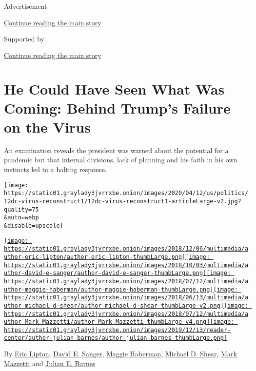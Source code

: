 Advertisement

\protect\hyperlink{after-top}{Continue reading the main story}

Supported by

\protect\hyperlink{after-sponsor}{Continue reading the main story}

\hypertarget{he-could-have-seen-what-was-coming-behind-trumps-failure-on-the-virus}{%
\section{He Could Have Seen What Was Coming: Behind Trump's Failure on
the
Virus}\label{he-could-have-seen-what-was-coming-behind-trumps-failure-on-the-virus}}

An examination reveals the president was warned about the potential for
a pandemic but that internal divisions, lack of planning and his faith
in his own instincts led to a halting response.

\texttt{[image: https://static01.graylady3jvrrxbe.onion/images/2020/04/12/us/politics/12dc-virus-reconstruct1/12dc-virus-reconstruct1-articleLarge-v2.jpg?quality=75\\\&auto=webp\\\&disable=upscale]}

\href{https://www.nytimes3xbfgragh.onion/by/eric-lipton}{\texttt{[image: https://static01.graylady3jvrrxbe.onion/images/2018/12/06/multimedia/author-eric-lipton/author-eric-lipton-thumbLarge.png]}}\href{https://www.nytimes3xbfgragh.onion/by/david-e-sanger}{\texttt{[image: https://static01.graylady3jvrrxbe.onion/images/2018/10/03/multimedia/author-david-e-sanger/author-david-e-sanger-thumbLarge.png]}}\href{https://www.nytimes3xbfgragh.onion/by/maggie-haberman}{\texttt{[image: https://static01.graylady3jvrrxbe.onion/images/2018/07/12/multimedia/author-maggie-haberman/author-maggie-haberman-thumbLarge.png]}}\href{https://www.nytimes3xbfgragh.onion/by/michael-d-shear}{\texttt{[image: https://static01.graylady3jvrrxbe.onion/images/2018/06/13/multimedia/author-michael-d-shear/author-michael-d-shear-thumbLarge-v2.png]}}\href{https://www.nytimes3xbfgragh.onion/by/mark-mazzetti}{\texttt{[image: https://static01.graylady3jvrrxbe.onion/images/2018/07/12/multimedia/author-Mark-Mazzetti/author-Mark-Mazzetti-thumbLarge-v4.png]}}\href{https://www.nytimes3xbfgragh.onion/by/julian-e-barnes}{\texttt{[image: https://static01.graylady3jvrrxbe.onion/images/2019/12/13/reader-center/author-julian-barnes/author-julian-barnes-thumbLarge.png]}}

By \href{https://www.nytimes3xbfgragh.onion/by/eric-lipton}{Eric
Lipton},
\href{https://www.nytimes3xbfgragh.onion/by/david-e-sanger}{David E.
Sanger},
\href{https://www.nytimes3xbfgragh.onion/by/maggie-haberman}{Maggie
Haberman},
\href{https://www.nytimes3xbfgragh.onion/by/michael-d-shear}{Michael D.
Shear}, \href{https://www.nytimes3xbfgragh.onion/by/mark-mazzetti}{Mark
Mazzetti} and
\href{https://www.nytimes3xbfgragh.onion/by/julian-e-barnes}{Julian E.
Barnes}

